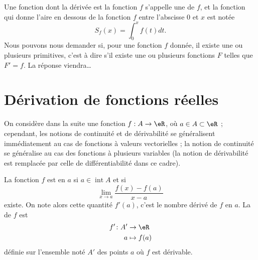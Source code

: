 Une fonction dont la dérivée est la fonction $f$ s'appelle une  de $f$, et la fonction qui donne l'aire en dessous de la fonction $f$ entre l'abscisse $0$ et $x$ est notée
\begin{equation}
	S_f(x)=\int_0^xf(t)dt.
\end{equation}
Nous pouvons nous demander si, pour une fonction $f$ donnée, il existe une ou plusieurs primitives, c'est à dire s'il existe une ou plusieurs fonctions $F$ telles que $F'=f$. La réponse viendra\ldots

\section{Dérivation de fonctions réelles}
\label{seccontetderiv}

On considère dans la suite une fonction $f : A \to \eR$, où $a \in A \subset \eR$ ; cependant, les notions de continuité et de dérivabilité se généralisent immédiatement au cas de fonctions à valeurs vectorielles ; la notion de continuité se généralise au cas des fonctions à plusieurs variables (la notion de dérivabilité est remplacée par celle de différentiabilité dans ce cadre).

\begin{definition}      \label{DEFooOYFZooFWmcAB}
    La fonction $f$ est  en \( a\) si $a \in
  \operatorname{int} A$ et si
  \begin{equation*}
    \lim_{x\to a} \frac{f(x)-f(a)}{x-a}
  \end{equation*}
  existe. On note alors cette quantité $f'(a)$, c'est le nombre
  dérivé de $f$ en $a$. La  de $f$ est
  \begin{equation}
      \begin{aligned}
          f'\colon A'&\to \eR \\
          a&\mapsto f(a)
      \end{aligned}
  \end{equation}
  définie sur l'ensemble noté $A'$ des points $a$ où $f$ est dérivable.
\end{definition}

